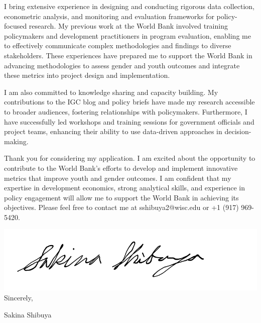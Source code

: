 \documentclass[12pt]{letter}
\begin{document}
I bring extensive experience in designing and conducting rigorous data collection, econometric analysis, and monitoring and evaluation frameworks 
for policy-focused research. My previous work at the World Bank involved training policymakers and development practitioners in program evaluation, 
enabling me to effectively communicate complex methodologies and findings to diverse stakeholders. These experiences have prepared me to support 
the World Bank in advancing methodologies to assess gender and youth outcomes and integrate these metrics into project design and implementation.

I am also committed to knowledge sharing and capacity building. My contributions to the IGC blog and policy briefs have made 
my research accessible to broader audiences, fostering relationships with policymakers. Furthermore, I have successfully led workshops and training sessions 
for government officials and project teams, enhancing their ability to use data-driven approaches in decision-making.

Thank you for considering my application.
I am excited about the opportunity to contribute to the World Bank's efforts to develop and implement innovative metrics that improve youth and gender outcomes. 
I am confident that my expertise in development economics, strong analytical skills, and experience in policy engagement will allow me to support the World Bank 
in achieving its objectives.
Please feel free to contact me at sshibuya2@wisc.edu or +1 (917) 969-5420.

\bigskip

\includegraphics[height=4\baselineskip]{signature.png}  \\

\vspace*{-6.5\baselineskip}Sincerely, 

\vspace{2.5\baselineskip}Sakina Shibuya
\end{document}
